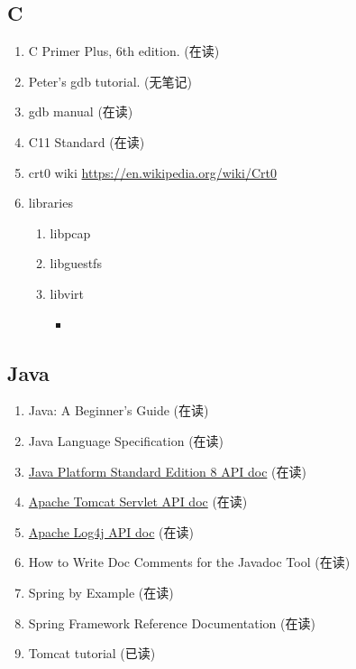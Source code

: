 \documentclass{article}
\begin{document}
\subsection{C}
\begin{enumerate}
    \item C Primer Plus, 6th edition. (在读)
    \item Peter's gdb tutorial. (无笔记)
    \item gdb manual (在读)
    \item C11 Standard (在读)
    \item crt0 wiki \url{https://en.wikipedia.org/wiki/Crt0}
    \item libraries
        \begin{enumerate}
            \item libpcap
            \item libguestfs
            \item libvirt
                \begin{itemize}
                    \item
                \end{itemize}
        \end{enumerate}
\end{enumerate}
\subsection{Java}
\begin{enumerate}
    \item Java: A Beginner's Guide (在读)
    \item Java Language Specification (在读)
    \item \href{http://docs.oracle.com/javase/8/docs/api/index.html?overview-summary.html}{Java Platform Standard Edition 8 API doc} (在读)
    \item \href{http://tomcat.apache.org/tomcat-8.0-doc/servletapi/}{Apache Tomcat Servlet API doc} (在读)
    \item \href{http://logging.apache.org/log4j/2.x/log4j-api/apidocs/index.html}{Apache Log4j API doc} (在读)
    \item How to Write Doc Comments for the Javadoc Tool (在读)
    \item Spring by Example (在读)
    \item Spring Framework Reference Documentation (在读)
    \item Tomcat tutorial (已读)
\end{enumerate}
\end{document}
